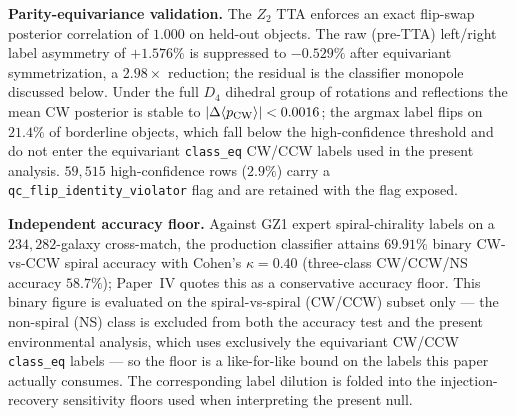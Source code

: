 \documentclass[aps,prd,twocolumn,superscriptaddress,showpacs,preprintnumbers,nofootinbib,longbibliography,floatfix]{revtex4-2}
\begin{document}
\textbf{Parity-equivariance validation.} The $Z_2$ TTA enforces an
exact flip-swap posterior correlation of $1.000$ on held-out objects.
The raw (pre-TTA) left/right label asymmetry of $+1.576\%$ is
suppressed to $-0.529\%$ after equivariant symmetrization, a
$2.98\times$ reduction; the residual is the classifier monopole
discussed below. Under the full $D_4$ dihedral group of rotations and
reflections the mean CW posterior is stable to
$|\Delta\langle p_{\rm CW}\rangle|<0.0016$; the $\mathrm{argmax}$ label
flips on $21.4\%$ of borderline objects, which fall below the
high-confidence threshold and do not enter the equivariant
\texttt{class\_eq} CW/CCW labels used in the present analysis.
$59{,}515$ high-confidence rows ($2.9\%$) carry a
\texttt{qc\_flip\_identity\_violator} flag and are retained with the
flag exposed.

\textbf{Independent accuracy floor.} Against GZ1 expert spiral-chirality
labels on a $234{,}282$-galaxy cross-match, the production classifier
attains $69.91\%$ binary CW-vs-CCW spiral accuracy with Cohen's
$\kappa=0.40$ (three-class CW/CCW/NS accuracy $58.7\%$); Paper~IV quotes
this as a conservative accuracy floor. This binary figure is evaluated
on the spiral-vs-spiral (CW/CCW) subset only --- the non-spiral (NS)
class is excluded from both the accuracy test and the present
environmental analysis, which uses exclusively the equivariant CW/CCW
\texttt{class\_eq} labels --- so the floor is a like-for-like bound on
the labels this paper actually consumes. The corresponding label
dilution is folded into the injection-recovery sensitivity floors used
when interpreting the present null.
\end{document}
